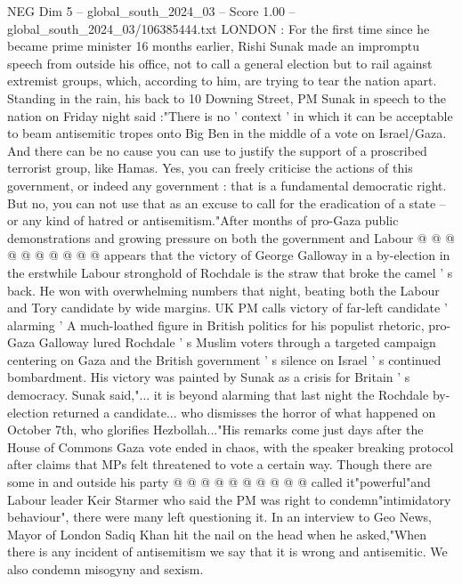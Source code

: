 \begin{textsample}{NEG Dim 5 – global\_south\_2024\_03 – Score 1.00 – global\_south\_2024\_03/106385444.txt}  \label{ex:f5_neg_209}
LONDON : For the first time since he became prime minister 16 months earlier, Rishi Sunak made an impromptu speech from outside his office, not to call a general election but to rail against extremist groups, which, according to him, are trying to tear the nation apart.
Standing in the rain, his back to 10 Downing Street, PM Sunak in speech to the nation on Friday night said :"There is no ' context ' in which it can be acceptable to beam antisemitic tropes onto Big Ben in the middle of a vote on Israel/Gaza.
And there can be no cause you can use to justify the support of a proscribed terrorist group, like Hamas.
Yes, you can freely criticise the actions of this government, or indeed any government : that is a fundamental democratic right.
But no, you can not use that as an excuse to call for the eradication of a state -- or any kind of hatred or antisemitism."After months of pro-Gaza public demonstrations and growing pressure on both the government and Labour @ @ @ @ @ @ @ @ @ @ appears that the victory of George Galloway in a by-election in the erstwhile Labour stronghold of Rochdale is the straw that broke the camel ' s back.
He won with overwhelming numbers that night, beating both the Labour and Tory candidate by wide margins.
UK PM calls victory of far-left candidate ' alarming ' A much-loathed figure in British politics for his populist rhetoric, pro-Gaza Galloway lured Rochdale ' s Muslim voters through a targeted campaign centering on Gaza and the British government ' s silence on Israel ' s continued bombardment.
His victory was painted by Sunak as a crisis for Britain ' s democracy.
Sunak said,"... it is beyond alarming that last night the Rochdale by-election returned a candidate... who dismisses the horror of what happened on October 7th, who glorifies Hezbollah..."His remarks come just days after the House of Commons Gaza vote ended in chaos, with the speaker breaking protocol after claims that MPs felt threatened to vote a certain way.
Though there are some in and outside his party @ @ @ @ @ @ @ @ @ @ called it"powerful"and Labour leader Keir Starmer who said the PM was right to condemn"intimidatory behaviour", there were many left questioning it.
In an interview to Geo News, Mayor of London Sadiq Khan hit the nail on the head when he asked,"When there is any incident of antisemitism we say that it is wrong and antisemitic.
We also condemn misogyny and sexism.

\end{textsample}
